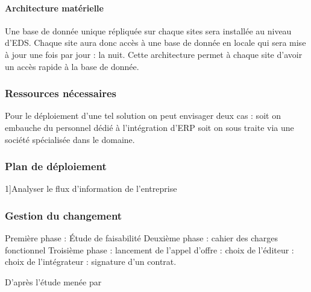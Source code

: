 \paragraph{Architecture matérielle}
Une base de donnée unique répliquée sur chaque sites sera installée au niveau d'EDS. Chaque site aura donc accès à une base de donnée en locale qui sera mise à jour une fois par jour : la nuit. Cette architecture permet à chaque site d'avoir un accès rapide à la base de donnée. 
\subsubsection{Ressources nécessaires}
Pour le déploiement d'une tel solution on peut envisager deux cas : soit on embauche du personnel dédié à l'intégration d'ERP soit on sous traite via une société spécialisée dans le domaine.
\subsubsection{Plan de déploiement}
1]Analyser le flux d'information de l'entreprise
\subsubsection{Gestion du changement}
Première phase : Étude de faisabilité
Deuxième phase : cahier des charges fonctionnel
Troisième phase : lancement de l'appel d'offre
                          : choix de l'éditeur
                          : choix de l'intégrateur
                          : signature d'un contrat.
                       
D'après l'étude menée par  
                     



